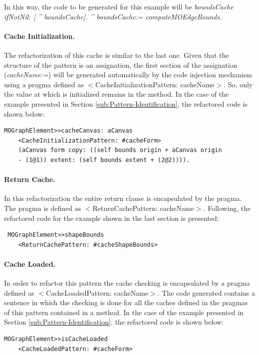 \documentclass[preprint,10pt]{sigplanconf}
\begin{document}
In this way, the code to be generated for this example will be \emph{boundsCache
ifNotNil: {[} \textasciicircum{} boundsCache{]}. \textasciicircum{}
boundsCache:= computeMOEdgeBounds.}

\paragraph{Cache Initialization.} The refactorization of this cache is
similar to the last one. Given that the structure of the pattern is
an assignation, the first section of the assignation (\emph{cacheName:=})
will be generated automatically by the code injection mechanism using
a pragma defined as $<$CacheInitializationPattern: cacheName$>$.
So, only the value at which is initialized remains in the method.
In the case of the example presented in Section \ref{sub:Pattern-Identification},
the refactored code is shown below:

\begin{lstlisting} 
MOGraphElement>>cacheCanvas: aCanvas 
	<CacheInitializationPattern: #cacheForm>  
	(aCanvas form copy: ((self bounds origin + aCanvas origin
	- (1@1)) extent: (self bounds extent + (2@2)))). 
\end{lstlisting}

\paragraph{Return Cache.} In this refactorization the entire return clause
is encapsulated by the pragma. The pragma is defined as $<$ReturnCachePattern:
cacheName$>$. Following, the refactored code for the example shown in
the last section is presented:

\begin{lstlisting}
 MOGraphElement>>shapeBounds 
	<ReturnCachePattern: #cacheShapeBounds> 
\end{lstlisting}

\paragraph{Cache Loaded.} In order to refactor this pattern the cache checking
is encapsulated by a pragma defined as $<$CacheLoadedPattern:
cacheName$>$. The code generated contains a sentence in which the checking
is done for all the caches defined in the pragmas of this pattern
contained in a method. In the case of the example presented in Section
\ref{sub:Pattern-Identification}, the refactored code is shown below:
\begin{lstlisting} 
MOGraphElement>>isCacheLoaded 
	<CacheLoadedPattern: #cacheForm>
\end{lstlisting}
\end{document}
